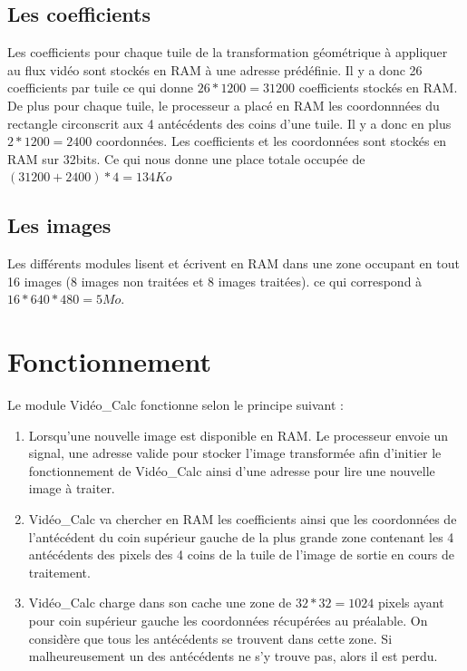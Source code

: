 \documentclass[a4paper,12pt]{report}
\begin{document}
{{	 \subsection*{Les coefficients}

	 Les coefficients pour chaque tuile de la transformation géométrique à appliquer au flux vidéo sont stockés en RAM à une adresse prédéfinie. Il y a donc 26 coefficients par tuile
		ce qui donne $26*1200 = 31200$ coefficients stockés en RAM. De plus pour chaque tuile, le processeur a placé en RAM les coordonnnées du rectangle circonscrit aux 4 antécédents des coins d'une tuile. Il y a donc en plus $2*1200 = 2400$ coordonnées.
		Les coefficients et les coordonnées sont stockés en RAM sur 32bits. Ce qui nous donne une place totale occupée de $(31200 + 2400)*4 = 134 Ko$

		\subsection*{Les images}

	 Les différents modules lisent et écrivent en RAM dans une zone occupant en tout 16 images (8 images non traitées et 8 images traitées). ce qui correspond à $16*640*480 = 5Mo$.

		\section{Fonctionnement}

	 Le module Vidéo\_Calc fonctionne selon le principe suivant :

		\begin{enumerate}

	 \item  Lorsqu'une nouvelle image est disponible en RAM. Le processeur envoie un signal, une adresse valide pour stocker l'image transformée afin d'initier le fonctionnement de Vidéo\_Calc ainsi d'une adresse pour lire une nouvelle image à traiter.

		\item Vidéo\_Calc va chercher en RAM les coefficients ainsi que les coordonnées de l'antécédent du coin supérieur gauche de la plus grande zone contenant les 4 antécédents des pixels des 4 coins de la tuile de l'image de sortie en cours de traitement.

		\item Vidéo\_Calc charge dans son cache une zone de $32*32 = 1024$ pixels ayant pour coin supérieur gauche les coordonnées récupérées au préalable. On considère que tous les antécédents se trouvent dans cette zone. Si malheureusement un des antécédents ne s'y trouve pas, alors il est perdu.


\end{enumerate}}}
\end{document}
